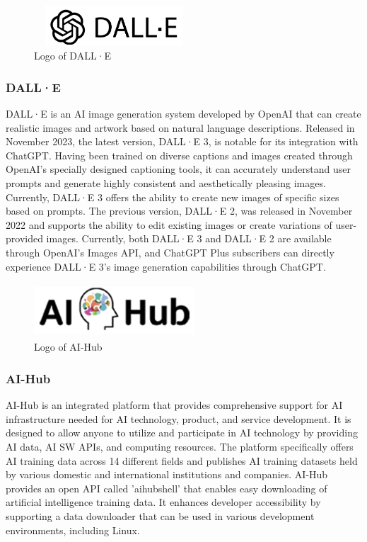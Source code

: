 \documentclass[conference]{IEEEtran}
\begin{document}
        \begin{figure}[htbp]
            \centerline{\includegraphics[width=6cm, height=1.5cm]{Images/logo/dalle.png}}
            \caption{Logo of DALL·E}
            \label{fig}
        \end{figure}
        \subsubsection{DALL·E}
            DALL·E is an AI image generation system developed by OpenAI that can create realistic images and artwork based on natural language descriptions. Released in November 2023, the latest version, DALL·E 3, is notable for its integration with ChatGPT. Having been trained on diverse captions and images created through OpenAI's specially designed captioning tools, it can accurately understand user prompts and generate highly consistent and aesthetically pleasing images. Currently, DALL·E 3 offers the ability to create new images of specific sizes based on prompts. The previous version, DALL·E 2, was released in November 2022 and supports the ability to edit existing images or create variations of user-provided images. Currently, both DALL·E 3 and DALL·E 2 are available through OpenAI's Images API, and ChatGPT Plus subscribers can directly experience DALL·E 3's image generation capabilities through ChatGPT.

        \begin{figure}[htbp]
            \centerline{\includegraphics[width=6cm, height=2cm]{Images/logo/aihub.png}}
            \caption{Logo of AI-Hub}
            \label{fig}
        \end{figure}
        \subsubsection{AI-Hub}
            AI-Hub is an integrated platform that provides comprehensive support for AI infrastructure needed for AI technology, product, and service development. It is designed to allow anyone to utilize and participate in AI technology by providing AI data, AI SW APIs, and computing resources. The platform specifically offers AI training data across 14 different fields and publishes AI training datasets held by various domestic and international institutions and companies. AI-Hub provides an open API called 'aihubshell' that enables easy downloading of artificial intelligence training data. It enhances developer accessibility by supporting a data downloader that can be used in various development environments, including Linux.
\end{document}
